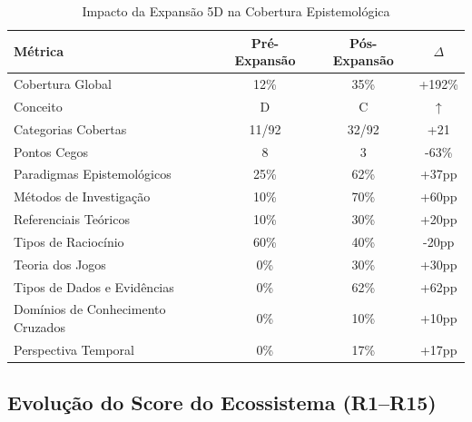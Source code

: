 \documentclass[12pt,a4paper]{article}
\begin{document}
\begin{table}[H]
  \centering
  \caption{Impacto da Expansão 5D na Cobertura Epistemológica}
  \begin{tabular}{l c c c}
    \toprule
    \textbf{Métrica} & \textbf{Pré-Expansão} & \textbf{Pós-Expansão} & \textbf{$\Delta$} \\
    \midrule
    Cobertura Global                & 12\%  & 35\%  & +192\% \\
    Conceito                        & D     & C     & $\uparrow$ \\
    Categorias Cobertas             & 11/92 & 32/92 & +21 \\
    Pontos Cegos                    & 8     & 3     & -63\% \\
    Paradigmas Epistemológicos      & 25\%  & 62\%  & +37pp \\
    Métodos de Investigação         & 10\%  & 70\%  & +60pp \\
    Referenciais Teóricos           & 10\%  & 30\%  & +20pp \\
    Tipos de Raciocínio             & 60\%  & 40\%  & -20pp \\
    Teoria dos Jogos                & 0\%   & 30\%  & +30pp \\
    Tipos de Dados e Evidências     & 0\%   & 62\%  & +62pp \\
    Domínios de Conhecimento Cruzados & 0\% & 10\%  & +10pp \\
    Perspectiva Temporal            & 0\%   & 17\%  & +17pp \\
    \bottomrule
  \end{tabular}
\end{table}

\subsection{Evolução do Score do Ecossistema (R1--R15)}
\end{document}
